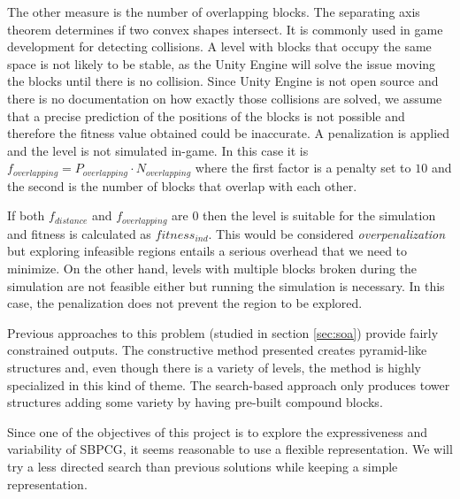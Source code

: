

The other measure is the number of overlapping blocks. The separating axis theorem\cite{ericson2004real} determines if two convex shapes intersect. It is commonly used in game development for detecting collisions. A level with blocks that occupy the same space is not likely to be stable, as the Unity Engine will solve the issue moving the blocks until there is no collision. Since Unity Engine is not open source and there is no documentation on how exactly those collisions are solved, we assume that a precise prediction of the positions of the blocks is not possible and therefore the fitness value obtained could be inaccurate. A penalization is applied and the level is not simulated in-game. In this case it is $f_{overlapping} = P_{overlapping} \cdot N_{overlapping}$ where the first factor is a penalty set to $10$ and the second is the number of blocks that overlap with each other. 

If both $f_{distance}$ and $f_{overlapping}$ are $0$ then the level is suitable for the simulation and fitness is calculated as $fitness_{ind}$. This would be considered \textit{overpenalization} but exploring infeasible regions entails a serious overhead that we need to minimize. On the other hand, levels with multiple blocks broken during the simulation are not feasible either but running the simulation is necessary. In this case, the penalization does not prevent the region to be explored.

Previous approaches to this problem (studied in section \ref{sec:soa}) provide fairly constrained outputs. The constructive method presented creates pyramid-like structures and, even though there is a variety of levels, the method is highly specialized in this kind of theme. The search-based approach only produces tower structures adding some variety by having pre-built compound blocks.

Since one of the objectives of this project is to explore the expressiveness and variability of SBPCG, it seems reasonable to use a flexible representation. We will try a less directed search than previous solutions while keeping a simple representation. 

